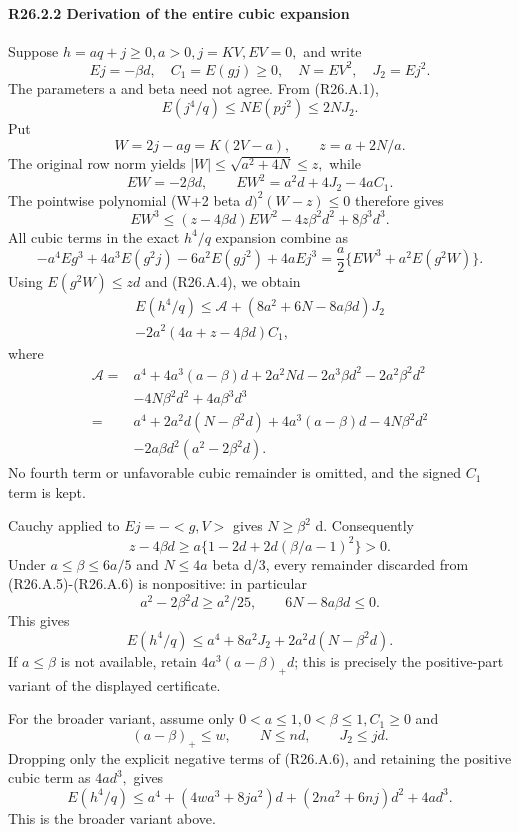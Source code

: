 \paragraph{R26.2.2 Derivation of the entire cubic expansion}

Suppose \(h=aq+j\ge 0,\allowbreak  a>0,\allowbreak  j=KV,\allowbreak  EV=0,\allowbreak \) and write
\[
Ej=-\beta d,\quad C_1=E(gj)\ge0,\quad
N=EV^2,\quad J_2=Ej^2.
\]
The parameters a and beta need not agree. From (R26.A.1),
\[
E(j^4/q)\le N E(pj^2)\le2NJ_2.                  \tag{R26.A.4}
\]
Put
\[
W=2j-ag=K(2V-a),\qquad z=a+2N/a.
\]
The original row norm yields |\(W|\le \sqrt{a^2+4N}\le z,\allowbreak \) while
\[
EW=-2\beta d,\qquad EW^2=a^2d+4J_2-4aC_1.
\]
The pointwise polynomial (W+2 beta \(d)^2(W-z)\le 0\) therefore gives
\[
EW^3\le(z-4\beta d)EW^2-4z\beta^2d^2+8\beta^3d^3.
\]
All cubic terms in the exact \(h^4/q\) expansion combine as
\[
-a^4Eg^3+4a^3E(g^2j)-6a^2E(gj^2)+4aEj^3
=\frac a2\{EW^3+a^2E(g^2W)\}.
\]
Using \(E(g^2W)\le zd\) and (R26.A.4), we obtain
\[
\begin{gathered}
E(h^4/q)\le\mathcal A+(8a^2+6N-8a\beta d)J_2\\
-2a^2(4a+z-4\beta d)C_1,
\end{gathered}\tag{R26.A.5}
\]
where
\[
\begin{aligned}
\mathcal A={}&a^4+4a^3(a-\beta)d+2a^2Nd
-2a^3\beta d^2-2a^2\beta^2d^2\\
&-4N\beta^2d^2+4a\beta^3d^3\\
={}&a^4+2a^2d(N-\beta^2d)
+4a^3(a-\beta)d-4N\beta^2d^2\\
&-2a\beta d^2(a^2-2\beta^2d).
\end{aligned}                                                        \tag{R26.A.6}
\]
No fourth term or unfavorable cubic remainder is omitted, and the signed \(C_1\) term is kept.

Cauchy applied to \(Ej=-<g,\allowbreak  V>\) gives \(N\ge \beta^2\) d. Consequently
\[
z-4\beta d
\ge a\{1-2d+2d(\beta/a-1)^2\}>0.
\]
Under \(a\le \beta\le 6a/5\) and \(N\le 4a\) beta d/3, every remainder discarded from
(R26.A.5)-(R26.A.6) is nonpositive: in particular
\[
a^2-2\beta^2d\ge a^2/25,\qquad
6N-8a\beta d\le0.
\]
This gives
\[
E(h^4/q)\le a^4+8a^2J_2+2a^2d(N-\beta^2d).       \tag{R26.A.7}
\]
If \(a\le \beta\) is not available, retain \(4a^3(a-\beta)_+d\); this is precisely
the positive-part variant of the displayed certificate.

For the broader variant, assume only \(0<a\le 1,\allowbreak  0<\beta\le 1,\allowbreak  C_1\ge 0\) and
\[
(a-\beta)_+\le w,\qquad N\le nd,\qquad J_2\le jd.
\]
Dropping only the explicit negative terms of (R26.A.6), and retaining the
positive cubic term as \(4ad^3,\allowbreak \) gives
\[
E(h^4/q)\le
a^4+(4wa^3+8ja^2)d+(2na^2+6nj)d^2+4ad^3.       \tag{R26.A.8}
\]
This is the broader variant above.

